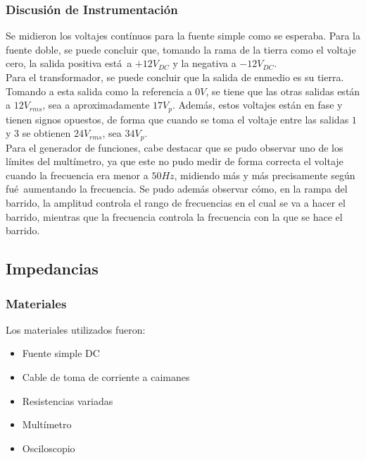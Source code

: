 \documentclass{article}
\begin{document}
\subsubsection{Discusi\'on de Instrumentaci\'on}
Se midieron los voltajes cont\'inuos para la fuente simple como se esperaba. Para la fuente doble, se puede concluir que, tomando la rama de la tierra como el voltaje cero, la salida positiva est\'a\ a $+12V_{DC}$ y la negativa a $-12V_{DC}$. \\
Para el transformador, se puede concluir que la salida de enmedio es su tierra. Tomando a esta salida como la referencia a $0V$, se tiene que las otras salidas est\'an a $12V_{rms}$, sea a aproximadamente $17V_p$. Adem\'as, estos voltajes est\'an en fase y tienen signos opuestos, de forma que cuando se toma el voltaje entre las salidas $1$ y $3$ se obtienen $24V_{rms}$, sea $34V_p$. \\
Para el generador de funciones, cabe destacar que se pudo observar uno de los l\'imites del mult\'imetro, ya que este no pudo medir de forma correcta el voltaje cuando la frecuencia era menor a $50Hz$, midiendo m\'as y m\'as precisamente seg\'un fu\'e\ aumentando la frecuencia. Se pudo adem\'as observar c\'omo, en la rampa del barrido, la amplitud controla el rango de frecuencias en el cual se va a hacer el barrido, mientras que la frecuencia controla la frecuencia con la que se hace el barrido.

\subsection{Impedancias}
\subsubsection{Materiales}
Los materiales utilizados fueron:
\begin{itemize}
\item Fuente simple DC
\item Cable de toma de corriente a caimanes
\item Resistencias variadas
\item Mult\'imetro
\item Osciloscopio
\end{itemize}
\end{document}
